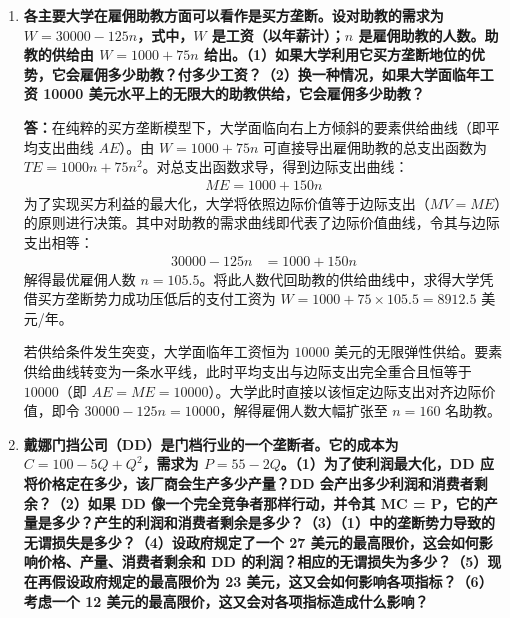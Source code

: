\begin{enumerate}[label=\textbf{\arabic*.}, leftmargin=*]
		
		
		\item \textbf{各主要大学在雇佣助教方面可以看作是买方垄断。设对助教的需求为 $W = 30000 - 125n$，式中，$W$ 是工资（以年薪计）；$n$ 是雇佣助教的人数。助教的供给由 $W = 1000 + 75n$ 给出。（1）如果大学利用它买方垄断地位的优势，它会雇佣多少助教？付多少工资？（2）换一种情况，如果大学面临年工资 10000 美元水平上的无限大的助教供给，它会雇佣多少助教？}
		
		\textbf{答：}在纯粹的买方垄断模型下，大学面临向右上方倾斜的要素供给曲线（即平均支出曲线 $AE$）。由 $W = 1000 + 75n$ 可直接导出雇佣助教的总支出函数为 $TE = 1000n + 75n^2$。对总支出函数求导，得到边际支出曲线：
		\[
		\begin{aligned}
			ME = 1000 + 150n
		\end{aligned}
		\]
		为了实现买方利益的最大化，大学将依照边际价值等于边际支出（$MV = ME$）的原则进行决策。其中对助教的需求曲线即代表了边际价值曲线，令其与边际支出相等：
		\[
		\begin{aligned}
			30000 - 125n &= 1000 + 150n
		\end{aligned}
		\]
		解得最优雇佣人数 $n = 105.5$。将此人数代回助教的供给曲线中，求得大学凭借买方垄断势力成功压低后的支付工资为 $W = 1000 + 75 \times 105.5 = 8912.5$ 美元/年。
		
		若供给条件发生突变，大学面临年工资恒为 $10000$ 美元的无限弹性供给。要素供给曲线转变为一条水平线，此时平均支出与边际支出完全重合且恒等于 $10000$（即 $AE = ME = 10000$）。大学此时直接以该恒定边际支出对齐边际价值，即令 $30000 - 125n = 10000$，解得雇佣人数大幅扩张至 $n = 160$ 名助教。
		
		\item \textbf{戴娜门挡公司（DD）是门档行业的一个垄断者。它的成本为 $C = 100 - 5Q + Q^2$，需求为 $P = 55 - 2Q$。（1）为了使利润最大化，DD 应将价格定在多少，该厂商会生产多少产量？DD 会产出多少利润和消费者剩余？（2）如果 DD 像一个完全竞争者那样行动，并令其 MC = P，它的产量是多少？产生的利润和消费者剩余是多少？（3）（1）中的垄断势力导致的无谓损失是多少？（4）设政府规定了一个 27 美元的最高限价，这会如何影响价格、产量、消费者剩余和 DD 的利润？相应的无谓损失为多少？（5）现在再假设政府规定的最高限价为 23 美元，这又会如何影响各项指标？（6）考虑一个 12 美元的最高限价，这又会对各项指标造成什么影响？}
		

\end{enumerate}

